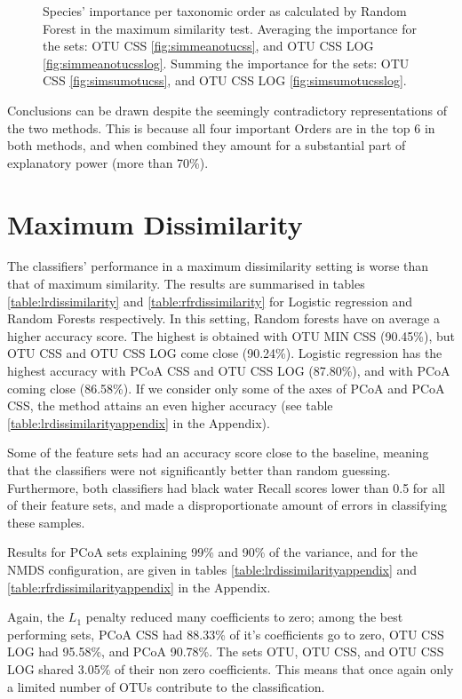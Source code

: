 \begin{figure}[!h]
		\caption{Species' importance per taxonomic order as calculated by Random Forest in the maximum similarity test. Averaging the importance for the sets: OTU CSS \ref{fig:simmeanotucss}, and OTU CSS LOG \ref{fig:simmeanotucsslog}. Summing the importance for the sets: OTU CSS \ref{fig:simsumotucss}, and OTU CSS LOG \ref{fig:simsumotucsslog}. }
	\label{fig:simpie}
\end{figure}

Conclusions can be drawn despite the seemingly contradictory representations of the two methods. This is because all four important Orders are in the top 6 in both methods, and when combined they amount for a substantial part of explanatory power (more than 70\%).    


\section{Maximum Dissimilarity}

The classifiers' performance in a maximum dissimilarity setting is worse than that of maximum similarity. The results are summarised in tables \ref{table:lrdissimilarity} and \ref{table:rfrdissimilarity} for Logistic regression and Random Forests respectively. In this setting, Random forests have on average a higher accuracy score. The highest is obtained with OTU MIN CSS (90.45\%), but OTU CSS and OTU CSS LOG come close (90.24\%). Logistic regression has the highest accuracy with PCoA CSS and OTU CSS LOG (87.80\%), and with PCoA coming close (86.58\%). If we consider only some of the axes of PCoA and PCoA CSS, the method attains an even higher accuracy (see table \ref{table:lrdissimilarityappendix} in the Appendix).

Some of the feature sets had an accuracy score close to the baseline, meaning that the classifiers were not significantly better than random guessing. Furthermore, both classifiers had black water Recall scores lower than 0.5 for all of their feature sets, and made a disproportionate amount of errors in classifying these samples. 

Results for PCoA sets explaining 99\% and 90\% of the variance, and for the NMDS configuration, are given in tables \ref{table:lrdissimilarityappendix} and \ref{table:rfrdissimilarityappendix} in the Appendix.

Again, the $L_1$ penalty reduced many coefficients to zero; among the best performing sets,  PCoA CSS had 88.33\% of it's coefficients go to zero, OTU CSS LOG had 95.58\%, and PCoA 90.78\%. The sets OTU, OTU CSS, and OTU CSS LOG shared 3.05\% of their non zero coefficients. This means that once again only a limited number of OTUs contribute to the classification. 
 
